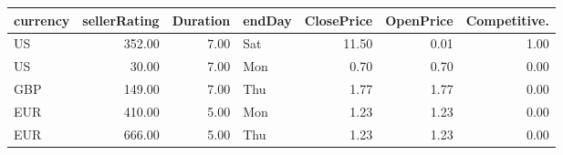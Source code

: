\begin{table}[ht]
\centering
\begin{tabular}{lrrlrrr}
  \hline
currency & sellerRating & Duration & endDay & ClosePrice & OpenPrice & Competitive. \\ 
  \hline
US & 352.00 & 7.00 & Sat & 11.50 & 0.01 & 1.00 \\ 
  US & 30.00 & 7.00 & Mon & 0.70 & 0.70 & 0.00 \\ 
  GBP & 149.00 & 7.00 & Thu & 1.77 & 1.77 & 0.00 \\ 
  EUR & 410.00 & 5.00 & Mon & 1.23 & 1.23 & 0.00 \\ 
  EUR & 666.00 & 5.00 & Thu & 1.23 & 1.23 & 0.00 \\ 
   \hline
\end{tabular}
\end{table}

